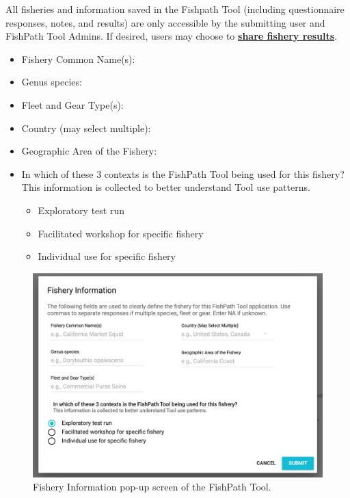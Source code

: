 \documentclass[
  11pt,
]{book}
\providecommand{\tightlist}{%
  \setlength{\itemsep}{0pt}\setlength{\parskip}{0pt}}
\begin{document}
All fisheries and information saved in the Fishpath Tool (including questionnaire responses, notes, and results) are only accessible by the submitting user and FishPath Tool Admins. If desired, users may choose to \protect\hyperlink{Results-Actions}{\textbf{share fishery results}}.

\begin{itemize}
\tightlist
\item
  Fishery Common Name(s):
\item
  Genus species:
\item
  Fleet and Gear Type(s):
\item
  Country (may select multiple):
\item
  Geographic Area of the Fishery:
\item
  In which of these 3 contexts is the FishPath Tool being used for this fishery? This information is collected to better understand Tool use patterns.

  \begin{itemize}
  \tightlist
  \item
    Exploratory test run\\
  \item
    Facilitated workshop for specific fishery
  \item
    Individual use for specific fishery
  \end{itemize}
\end{itemize}

\begin{figure}

{\centering \includegraphics[width=0.95\linewidth]{images/fishery-info-screen} 

}

\caption{Fishery Information pop-up screen of the FishPath Tool.}\label{fig:fishery-info}
\end{figure}
\end{document}
